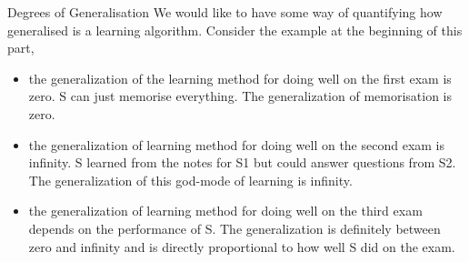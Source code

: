\documentclass[11pt,notheorems,hyperref={pdfauthor=whatever}]{beamer}
\begin{document}
\begin{frame}{Degrees of Generalisation}
We would like to have some way of quantifying how generalised is a learning algorithm. Consider the example at the beginning of this part,
\begin{itemize}
    \item the generalization of the learning method for doing well on the first exam is \alert{zero}. \alert{S} can just memorise everything. The generalization of memorisation is \alert{zero}.
    \item the generalization of learning method for doing well on the second exam is \alert{infinity}. \alert{S} learned from the notes for \alert{S1} but could answer questions from \alert{S2}. The generalization of this god-mode of learning is \alert{infinity}.
    \item the generalization of learning method for doing well on the third exam depends on the performance of \alert{S}. The generalization is definitely between zero and infinity and is directly proportional to how well \alert{S} did on the exam.
\end{itemize}
\end{frame}
\end{document}
